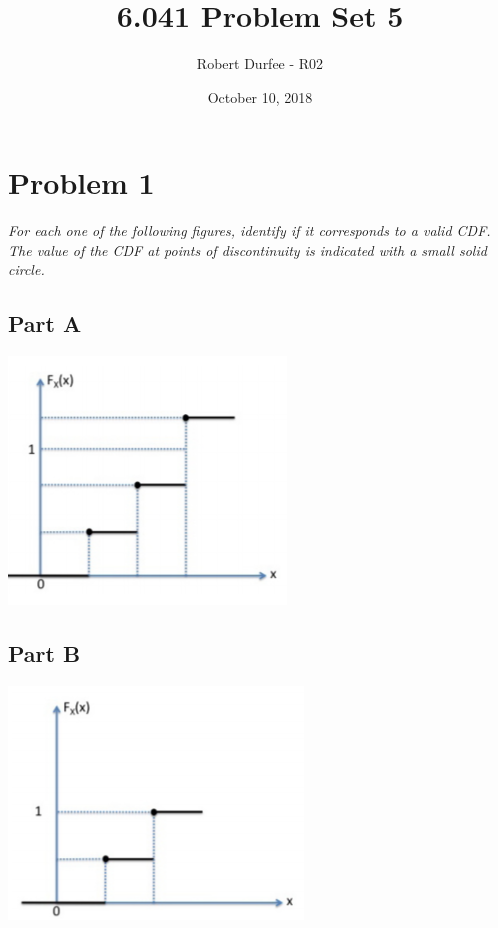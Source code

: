 \documentclass{article}
\title{6.041 Problem Set 5}
\author{Robert Durfee - R02}
\date{October 10, 2018}
\begin{document}
\maketitle

\section*{Problem 1}

\textit{For each one of the following figures, identify if it corresponds to
a valid CDF. The value of the CDF at points of discontinuity is indicated
with a small solid circle.}

\subsection*{Part A}

\begin{center}
    \includegraphics[scale=1]{Images/P1A.PNG}
\end{center}

\subsection*{Part B}

\begin{center}
    \includegraphics[scale=1]{Images/P1B.PNG}
\end{center}
\end{document}
